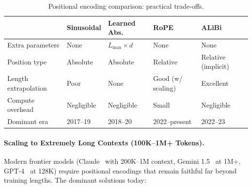 \begin{table}[ht!]
\centering
\caption{Positional encoding comparison: practical trade-offs.}
\begin{tabular}{@{}lp{2.5cm}p{2.8cm}p{2.8cm}p{2.8cm}@{}}
\toprule
 & \textbf{Sinusoidal} & \textbf{Learned Abs.} & \textbf{RoPE} & \textbf{ALiBi} \\
\midrule
Extra parameters & None & $L_{\max} \times d$ & None & None \\
Position type & Absolute & Absolute & Relative & Relative (implicit) \\
Length extrapolation & Poor & None & Good (w/ scaling) & Excellent \\
Compute overhead & Negligible & Negligible & Small & Negligible \\
Dominant era & 2017--19 & 2018--20 & 2022--present & 2022--23 \\
\bottomrule
\end{tabular}
\end{table}

\paragraph{Scaling to Extremely Long Contexts (100K--1M+ Tokens).}
\label{scaling-to-extremely-long-contexts-100k1m-tokens.}

Modern frontier models (Claude~\cite{anthropic2024claude3} with 200K--1M context, Gemini 1.5~\cite{geminiteam2024gemini15} at 1M+, GPT-4~\cite{openai2023gpt4} at 128K) require positional encodings that remain faithful far beyond training lengths. The dominant solutions today:

